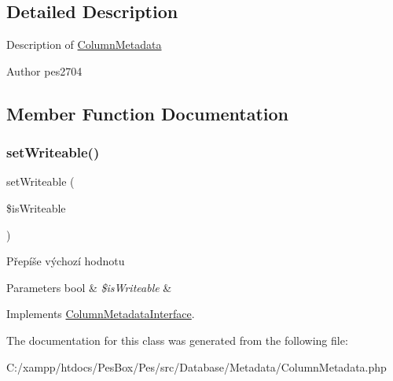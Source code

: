\subsection{Detailed Description}
Description of \mbox{\hyperlink{class_pes_1_1_database_1_1_metadata_1_1_column_metadata}{Column\+Metadata}}

\begin{DoxyAuthor}{Author}
pes2704 
\end{DoxyAuthor}


\subsection{Member Function Documentation}
\mbox{\label{class_pes_1_1_database_1_1_metadata_1_1_column_metadata_a0a0e7f080e4989bd257fa905bfb19c64}} 
\subsubsection{\texorpdfstring{set\+Writeable()}{setWriteable()}}
{\footnotesize\ttfamily set\+Writeable (\begin{DoxyParamCaption}\item[{}]{\$is\+Writeable }\end{DoxyParamCaption})}

Přepíše výchozí hodnotu 
\begin{DoxyParams}[1]{Parameters}
bool & {\em \$is\+Writeable} & \\
\hline
\end{DoxyParams}


Implements \mbox{\hyperlink{interface_pes_1_1_database_1_1_metadata_1_1_column_metadata_interface_a0a0e7f080e4989bd257fa905bfb19c64}{Column\+Metadata\+Interface}}.



The documentation for this class was generated from the following file\+:\begin{DoxyCompactItemize}
\item 
C\+:/xampp/htdocs/\+Pes\+Box/\+Pes/src/\+Database/\+Metadata/Column\+Metadata.\+php\end{DoxyCompactItemize}
